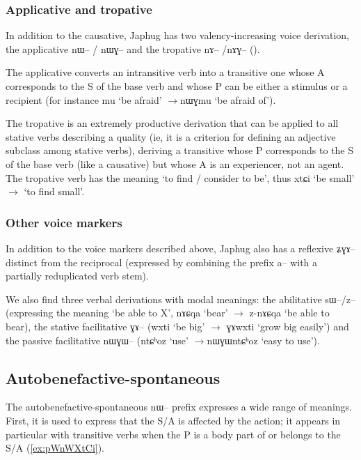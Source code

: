 \documentclass[oldfontcommands,oneside,a4paper,11pt]{article}
\newcommand{\ipa}[1]{{\phon #1}} %
\begin{document}
\subsubsection{Applicative and tropative}
In addition to the causative, Japhug has two valency-increasing voice derivation, the applicative \ipa{nɯ--} / \ipa{nɯɣ--} and the tropative \ipa{nɤ--} /\ipa{nɤɣ--} (\citealt{jacques13tropative}).

The applicative converts an intransitive verb into a transitive one whose A corresponds to the S of the base verb and whose P can be either a stimulus or a recipient (for instance \ipa{mu} `be afraid' $\rightarrow$\ipa{nɯɣmu} `be afraid of'). 

The tropative is an extremely productive derivation that can be applied to all stative verbs describing a quality (ie, it is a criterion for defining an adjective subclass among stative verbs), deriving a transitive whose P corresponds to the S of the base verb (like a causative) but whose A is an experiencer, not an agent. The tropative verb has the meaning `to find / consider to be', thus \ipa{xtɕi} `be small' $\rightarrow$ `to find small'.

\subsubsection{Other voice markers}
In addition to the voice markers described above, Japhug also has a reflexive \ipa{ʑɣɤ--} distinct from the reciprocal (expressed by combining the prefix \ipa{a--} with a partially reduplicated verb stem).

We also find three verbal derivations with modal meanings: the abilitative \ipa{sɯ--/z--} (expressing the meaning `be able to X', \ipa{nɤɕqa} `bear' $\rightarrow$ \ipa{z-nɤɕqa} `be able to bear), the stative facilitative \ipa{ɣɤ--} (\ipa{wxti} `be big' $\rightarrow$ \ipa{ɣɤwxti} `grow big easily') and the passive facilitative \ipa{nɯɣɯ--} (\ipa{ntɕʰoz} `use' $\rightarrow$\ipa{nɯɣɯntɕʰoz} `easy to use').
   
\subsection{Autobenefactive-spontaneous}

The autobenefactive-spontaneous \ipa{nɯ--} prefix expresses a wide range of meanings. First, it is used to express that the S/A is affected by the action; it appears in particular with transitive verbs when the P is a body part of or belongs to the S/A (\ref{ex:pWnWXtCi}).
\end{document}

